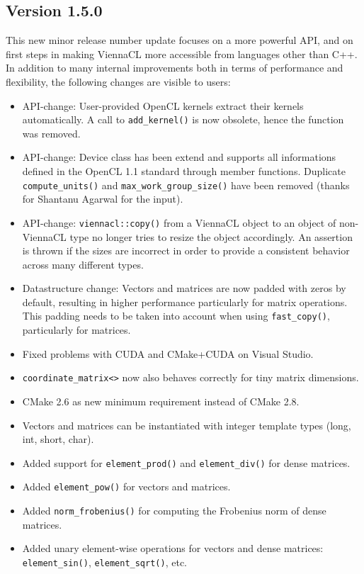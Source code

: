 \subsection*{Version 1.5.0}
This new minor release number update focuses on a more powerful API, and on first steps in making ViennaCL more accessible from languages other than C++.
In addition to many internal improvements both in terms of performance and flexibility, the following changes are visible to users:
\begin{itemize}
 \item API-change: User-provided OpenCL kernels extract their kernels automatically. A call to \lstinline|add_kernel()| is now obsolete, hence the function was removed.
 \item API-change: Device class has been extend and supports all informations defined in the OpenCL 1.1 standard through member functions. Duplicate \lstinline|compute_units()| and \lstinline|max_work_group_size()| have been removed (thanks for Shantanu Agarwal for the input).
 \item API-change: \lstinline|viennacl::copy()| from a ViennaCL object to an object of non-ViennaCL type no longer tries to resize the object accordingly. An assertion is thrown if the sizes are incorrect in order to provide a consistent behavior across many different types.
 \item Datastructure change: Vectors and matrices are now padded with zeros by default, resulting in higher performance particularly for matrix operations. This padding needs to be taken into account when using \lstinline|fast_copy()|, particularly for matrices.
 \item Fixed problems with CUDA and CMake+CUDA on Visual Studio.
 \item \lstinline|coordinate_matrix<>| now also behaves correctly for tiny matrix dimensions.
 \item CMake 2.6 as new minimum requirement instead of CMake 2.8.
 \item Vectors and matrices can be instantiated with integer template types (long, int, short, char).
 \item Added support for \lstinline|element_prod()| and \lstinline|element_div()| for dense matrices.
 \item Added \lstinline|element_pow()| for vectors and matrices.
 \item Added \lstinline|norm_frobenius()| for computing the Frobenius norm of dense matrices.
 \item Added unary element-wise operations for vectors and dense matrices: \lstinline|element_sin()|, \lstinline|element_sqrt()|, etc.

\end{itemize}
